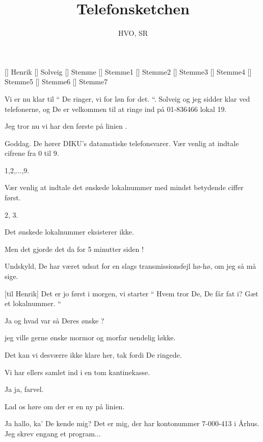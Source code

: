 \documentclass[a4paper,11pt]{article}
\title{Telefonsketchen}
\author{HVO, SR}
\begin{document}
\maketitle

\begin{roles}
[] Henrik
[] Solveig
[] Stemme
[] Stemme1
[] Stemme2
[] Stemme3
[] Stemme4
[] Stemme5
[] Stemme6
[] Stemme7
\end{roles}


\begin{sketch}

 Vi er nu klar til `` De ringer, vi for løn for det. ``. Solveig og
jeg sidder klar ved telefonerne, og De er velkommen til at ringe ind på
01-836466 lokal 19.

 Jeg tror nu vi har den første på linien .

 Goddag. De hører DIKU's datamatiske telefonsvarer. Vær venlig at
indtale cifrene fra 0 til 9.

  1,2,...,9.

 Vær venlig at indtale det ønskede lokalnummer med mindst betydende
ciffer først.

 2, 3.

 Det ønskede lokalnummer eksisterer ikke.

 Men det gjorde det da for 5 minutter siden !

 Undskyld, De har været udsat for en slags transmissionsfejl
hø-hø, om jeg så må sige.

[til Henrik] Det er jo først i morgen, vi starter `` Hvem tror De,
De får fat i? Gæt et lokalnummer. ``

 Ja og hvad var så Deres ønske ?

 jeg ville gerne ønske mormor og morfar uendelig løkke.

 Det kan vi desværre ikke klare her, tak fordi De ringede.

 Vi har ellers samlet ind i en tom kantinekasse.

 Ja ja, farvel.

 Lad os høre om der er en ny på linien.

 Ja hallo, ka' De kende mig? Det er mig, der har kontonummer
7-000-413 i Århus. Jeg skrev engang et program...


\end{sketch}
\end{document}
